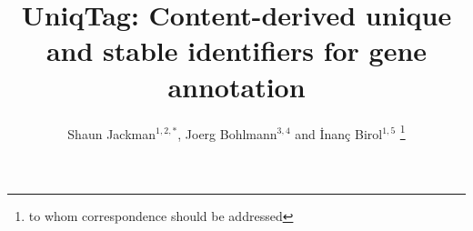 \documentclass{bioinfo}
\begin{document}

\title[UniqTag]{
UniqTag: Content-derived unique and stable identifiers for gene annotation}
\author[Jackman \textit{et al.}]{
Shaun Jackman$^{1,2,*}$, Joerg Bohlmann$^{3,4}$ and \.{I}nan\c{c} Birol$^{1,5}$
\footnote{to whom correspondence should be addressed}
}

\address{
$^1$Genome Sciences Centre, British Columbia Cancer Agency, Vancouver, BC, Canada
\\$^2$Graduate Program in Bioinformatics, University of British Columbia, Vancouver, BC, Canada
\\$^3$Michael Smith Laboratories, University of British Columbia, Vancouver, BC, Canada
\\$^4$Department of Forest Sciences, University of British Columbia, Vancouver, BC, Canada
\\$^5$Department of Medical Genetics, University of British Columbia, Vancouver, BC, Canada
}



\maketitle
\end{document}
